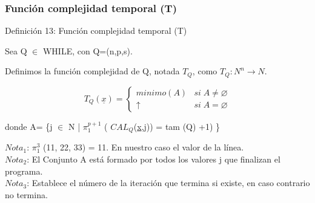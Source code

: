\documentclass[xcolor=table]{beamer}
\begin{document}
\begin{frame}[fragile]
\begin{columns}
\end{columns}

\end{frame}

\begin{frame}[fragile]\frametitle{ Función complejidad temporal (T) } \footnotesize  


\begin{block}{Definición 13: Función complejidad temporal (T) }
\end{block}

Sea Q $\in$ WHILE, con Q=(n,p,s). 

Definimos la función complejidad de Q, notada $T_Q$, como $T_Q: N^{n} \rightarrow N$.

 \scriptsize\begin{equation*} T_Q(\underline{x}) = 
            \begin{cases} 
                    minimo(A)      & si\; A \neq  \varnothing\\
                    \uparrow       & si\; A =  \varnothing 
            \end{cases} \end{equation*}   

donde A= \{j $\in$ N | $\pi^{p+1}_1$ ( $CAL_Q$(\underline{x},j)) = tam (Q) +1) \}\\\break


\scriptsize $Nota_1$: $\pi^{3}_1$ (11, 22, 33) = 11. En nuestro caso el valor de la línea.\\
$Nota_2$: El Conjunto A está formado por todos los valores j que finalizan el programa.\\
$Nota_3$: Establece el número de la iteración que termina si existe, en caso contrario no termina.

\end{frame}
\end{document}

